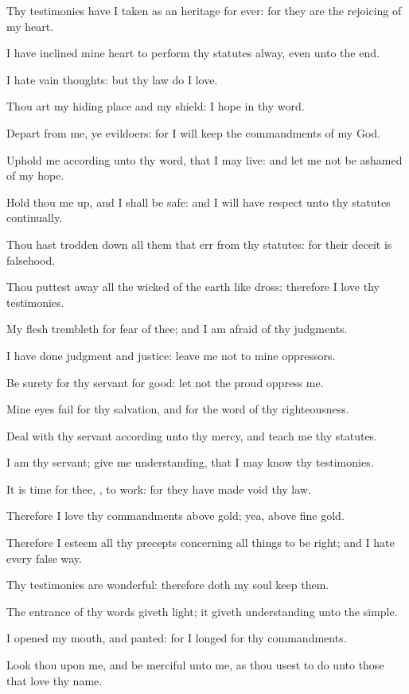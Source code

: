\verse Thy testimonies have I taken as an heritage for ever: for they are the rejoicing of my heart.

\verse I have inclined mine heart to perform thy statutes alway, even unto the end.

\verse I hate vain thoughts: but thy law do I love.

\verse Thou art my hiding place and my shield: I hope in thy word.

\verse Depart from me, ye evildoers: for I will keep the commandments of my God.

\verse Uphold me according unto thy word, that I may live: and let me not be ashamed of my hope.

\verse Hold thou me up, and I shall be safe: and I will have respect unto thy statutes continually.

\verse Thou hast trodden down all them that err from thy statutes: for their deceit is falsehood.

\verse Thou puttest away all the wicked of the earth like dross: therefore I love thy testimonies.

\verse My flesh trembleth for fear of thee; and I am afraid of thy judgments.

\verse I have done judgment and justice: leave me not to mine oppressors.

\verse Be surety for thy servant for good: let not the proud oppress me.

\verse Mine eyes fail for thy salvation, and for the word of thy righteousness.

\verse Deal with thy servant according unto thy mercy, and teach me thy statutes.

\verse I am thy servant; give me understanding, that I may know thy testimonies.

\verse It is time for thee, \LORD, to work: for they have made void thy law.

\verse Therefore I love thy commandments above gold; yea, above fine gold.

\verse Therefore I esteem all thy precepts concerning all things to be right; and I hate every false way.

\verse Thy testimonies are wonderful: therefore doth my soul keep them.

\verse The entrance of thy words giveth light; it giveth understanding unto the simple.

\verse I opened my mouth, and panted: for I longed for thy commandments.

\verse Look thou upon me, and be merciful unto me, as thou usest to do unto those that love thy name.

